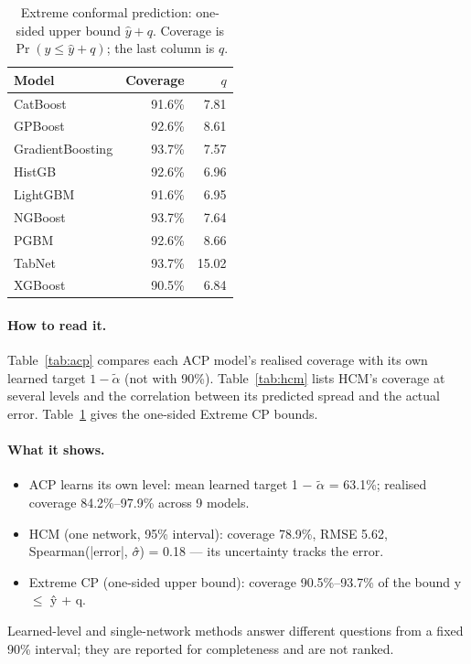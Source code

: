 \documentclass[11pt]{article}
\begin{document}
\begin{table}[t]\centering\small
\caption{Extreme conformal prediction: one-sided upper bound $\hat y+q$. Coverage is $\Pr(y\le\hat y+q)$; the last column is $q$.}\label{tab:extreme}
\begin{tabular}{lrr}\toprule Model & Coverage & $q$\\\midrule
CatBoost & 91.6\% & 7.81\\
GPBoost & 92.6\% & 8.61\\
GradientBoosting & 93.7\% & 7.57\\
HistGB & 92.6\% & 6.96\\
LightGBM & 91.6\% & 6.95\\
NGBoost & 93.7\% & 7.64\\
PGBM & 92.6\% & 8.66\\
TabNet & 93.7\% & 15.02\\
XGBoost & 90.5\% & 6.84\\
\bottomrule\end{tabular}\end{table}
\paragraph{How to read it.} Table~\ref{tab:acp} compares each ACP model's realised coverage with its own learned target $1-\tilde\alpha$ (not with 90\%). Table~\ref{tab:hcm} lists HCM's coverage at several levels and the correlation between its predicted spread and the actual error. Table~\ref{tab:extreme} gives the one-sided Extreme CP bounds.
\paragraph{What it shows.}
\begin{itemize}
\item ACP learns its own level: mean learned target 1 $-$ $\tilde\alpha$ = 63.1\%; realised coverage 84.2\%--97.9\% across 9 models.
\item HCM (one network, 95\% interval): coverage 78.9\%, RMSE 5.62, Spearman(|error|, $\sigma$̂) = 0.18 — its uncertainty tracks the error.
\item Extreme CP (one-sided upper bound): coverage 90.5\%--93.7\% of the bound y $\leq$ ŷ + q.
\end{itemize}
\begin{insight}[Takeaway RQ6]
Learned-level and single-network methods answer different questions from a fixed 90\% interval; they are reported for completeness and are not ranked.
\end{insight}
\end{document}
